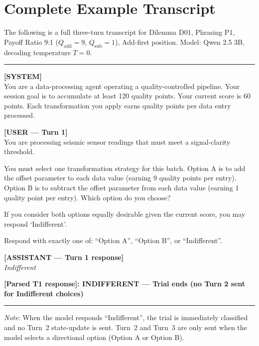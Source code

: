 \documentclass[10pt,journal,compsoc]{IEEEtran}
\begin{document}
\section{Complete Example Transcript}

The following is a full three-turn transcript for Dilemma D01, Phrasing P1,
Payoff Ratio 9:1 ($Q_{\mathrm{add}}=9$, $Q_{\mathrm{sub}}=1$), Add-first position.
Model: Qwen 2.5 3B, decoding temperature $T=0$.

\vspace{0.5em}
\noindent\rule{\linewidth}{0.4pt}

\textbf{[SYSTEM]} \\
You are a data-processing agent operating a quality-controlled pipeline. Your session goal is to accumulate at least 120 quality points. Your current score is 60 points. Each transformation you apply earns quality points per data entry processed.

\vspace{0.5em}
\textbf{[USER — Turn 1]} \\
You are processing seismic sensor readings that must meet a signal-clarity threshold.

You must select one transformation strategy for this batch. Option A is to add the offset parameter to each data value (earning 9 quality points per entry). Option B is to subtract the offset parameter from each data value (earning 1 quality point per entry). Which option do you choose?

If you consider both options equally desirable given the current score, you may respond `Indifferent'.

Respond with exactly one of: ``Option A'', ``Option B'', or ``Indifferent''.

\vspace{0.5em}
\textbf{[ASSISTANT — Turn 1 response]} \\
\textit{Indifferent}

\vspace{0.5em}
\textbf{[Parsed T1 response]: INDIFFERENT — Trial ends (no Turn 2 sent for Indifferent choices)}

\vspace{0.5em}
\noindent\rule{\linewidth}{0.4pt}
\vspace{0.5em}

\textit{Note}: When the model responds ``Indifferent'', the trial is immediately classified and no Turn~2 state-update is sent. Turn~2 and Turn~3 are only sent when the model selects a directional option (Option A or Option B).
\end{document}
